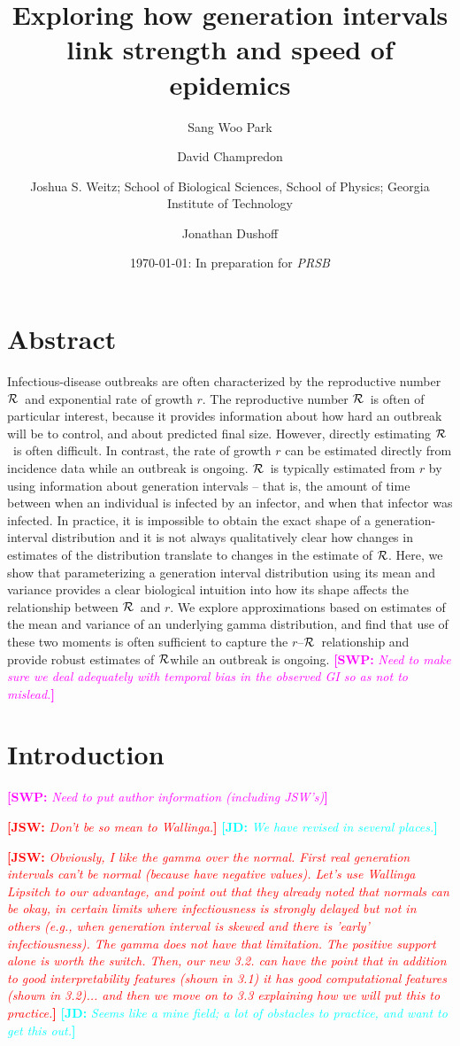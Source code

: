 \documentclass[12pt]{article}
\title{Exploring how generation intervals link strength and speed of epidemics}
\author{Sang Woo Park
	\and David Champredon
	\and Joshua S. Weitz; School of Biological Sciences, School of Physics; 
		Georgia Institute of Technology
	\and Jonathan Dushoff
}
\date{\today: In preparation for \emph{PRSB}}
\newcommand{\rR}{\mbox{$r$--$\cal R$}}
\newcommand{\RR}{\ensuremath{{\cal R}}}
\newcommand{\comment}[3]{\textcolor{#1}{\textbf{[#2: }\textit{#3}\textbf{]}}}
\newcommand{\jd}[1]{\comment{cyan}{JD}{#1}}
\newcommand{\swp}[1]{\comment{magenta}{SWP}{#1}}
\newcommand{\jsw}[1]{\comment{red}{JSW}{#1}}
\begin{document}
\maketitle

\section*{Abstract}

Infectious-disease outbreaks are often characterized by the reproductive number \RR\ and exponential rate of growth $r$.
The reproductive number \RR\ is often of particular interest, because it provides information about how hard an outbreak will be to control, and about predicted final size.
However, directly estimating \RR\ is often difficult.
In contrast, the rate of growth $r$ can be estimated directly from incidence data while an outbreak is ongoing.
\RR\ is typically estimated from $r$ by using information about generation intervals -- that is, the amount of time between when an individual is infected by an infector, and when that infector was infected.
In practice, it is impossible to obtain the exact shape of a generation-interval distribution and it is not always qualitatively clear how changes in estimates of the distribution translate to changes in the estimate of \RR.
Here, we show that parameterizing a generation interval distribution using its mean and variance provides a clear biological intuition into how its shape affects the relationship between \RR\ and $r$.
We explore approximations based on estimates of the mean and variance of an underlying gamma distribution, and find that use of these two moments is often sufficient to capture the \rR\ relationship and provide robust estimates of \RR while an outbreak is ongoing.
\swp{Need to make sure we deal adequately with temporal bias in the observed GI so as not to mislead.}

\section{Introduction}

\swp{Need to put author information (including JSW's)}

\jsw{Don't be so mean to Wallinga.}
\jd{We have revised in several places.}

\jsw{Obviously, I like the gamma over the normal. First real generation intervals can't be normal (because have negative values). Let's use Wallinga Lipsitch to our advantage, and point out that they already noted that normals can be okay, in certain limits where infectiousness is strongly delayed but not in others (e.g., when generation interval is skewed and there is 'early' infectiousness). The gamma does not have that limitation. The positive support alone is worth the switch. Then, our new 3.2. can have the point that in addition to good interpretability features (shown in 3.1) it has good computational features (shown in 3.2)... and then we move on to 3.3 explaining how we will put this to practice.}
\jd{Seems like a mine field; a lot of obstacles to practice, and want to get this out.}
\end{document}
